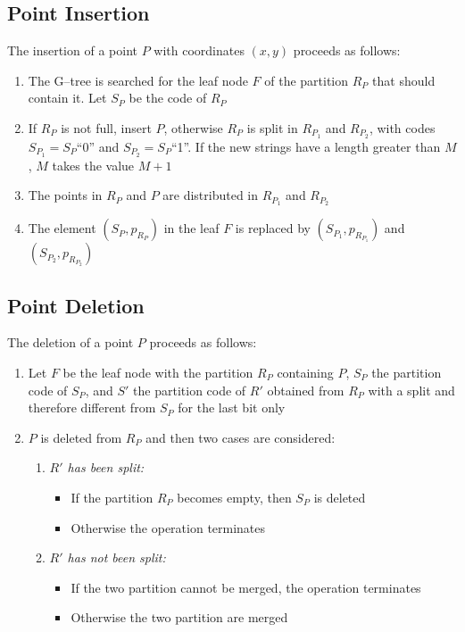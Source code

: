 \subsection{Point Insertion}
The insertion of a point $P$ with coordinates $(x, y)$ proceeds as follows:
\begin{enumerate}
    \item The G–tree is searched for the leaf node $F$ of the partition $R_P$ that should contain it. Let $S_P$ be the code of $R_P$
    \item If $R_P$ is not full, insert $P$, otherwise $R_P$ is split in $R_{P_1}$ and $R_{P_2}$, with codes $S_{P_1} = S_P$“0” and $S_{P_2} = S_P$“1”. If the new strings have a length greater than $M$, $M$ takes the value $M + 1$
    \item The points in $R_P$ and $P$ are distributed in $R_{P_1}$ and $R_{P_2}$
    \item The element $(S_P, p_{R_P})$ in the leaf $F$ is replaced by $(S_{P_1}, p_{R_{P_1}})$ and $(S_{P_2}, p_{R_{P_2}})$
\end{enumerate}

\subsection{Point Deletion}
The deletion of a point $P$ proceeds as follows:
\begin{enumerate}
    \item Let $F$ be the leaf node with the partition $R_P$ containing $P$, $S_P$ the partition code of $S_P$, and $S'$ the partition code of $R'$ obtained from $R_P$ with a split and therefore different from $S_P$ for the last bit only
    \item $P$ is deleted from $R_P$ and then two cases are considered:
    \begin{enumerate}
        \item \textit{$R'$ has been split:} 
        \begin{itemize}
            \item If the partition $R_P$ becomes empty, then $S_P$ is deleted
            \item Otherwise the operation terminates
        \end{itemize}
        \item \textit{$R'$ has not been split:}
        \begin{itemize}
            \item If the two partition cannot be merged, the operation terminates
            \item Otherwise the two partition are merged
        \end{itemize}
    \end{enumerate}
\end{enumerate}


